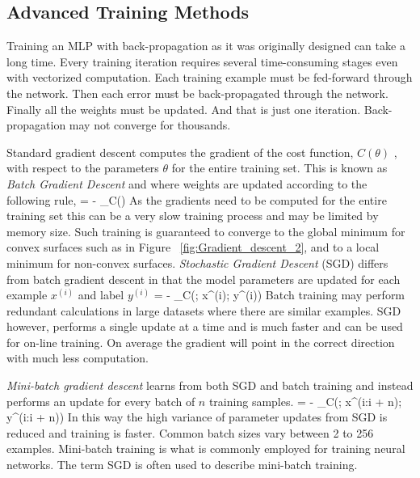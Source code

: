 \subsection{Advanced Training Methods}

Training an MLP with back-propagation as it was originally designed can take a long time.
Every training iteration requires several time-consuming stages even with vectorized computation.
Each training example must be fed-forward through the network.
Then each error must be back-propagated through the network.
Finally all the weights must be updated.
And that is just one iteration.
Back-propagation may not converge for thousands.

Standard gradient descent computes the gradient of the cost function, $C(\theta)$ , with respect to the parameters $\theta$ for the entire training set.
This is known as \textit{Batch Gradient Descent} and where weights are updated according to the following rule,
\be
\theta = \theta - \eta \dot \Delta_\theta C(\theta)
\ee
As the gradients need to be computed for the entire training set this can be a very slow training process and may be limited by memory size.
Such training is guaranteed to converge to the global minimum for convex surfaces such as in Figure ~\ref{fig:Gradient_descent_2}, and to a local minimum for non-convex surfaces.
\textit{Stochastic Gradient Descent} (SGD) differs from batch gradient descent in that the model parameters are updated for each example $x^{(i)}$ and label $y^{(i)}$
\be
\theta = \theta - \eta \dot \Delta_\theta C(\theta; x^{(i)}; y^{(i)}) \label{eq:updateEquation}
\ee
Batch training may perform redundant calculations in large datasets where there are similar examples.
SGD however, performs a single update at a time and is much faster and can be used for on-line training.
On average the gradient will point in the correct direction with much less computation.

\textit{Mini-batch gradient descent} learns from both SGD and batch training and instead performs an update for every batch of $n$ training samples.
\be
\theta = \theta - \eta \dot \Delta_\theta C(\theta; x^{(i:i + n)}; y^{(i:i + n)})
\ee
In this way the high variance of parameter updates from SGD is reduced and training is faster\citep{lecun2012efficient}.
Common batch sizes vary between 2 to 256 examples.
Mini-batch training is what is commonly employed for training neural networks.
The term SGD is often used to describe mini-batch training.


